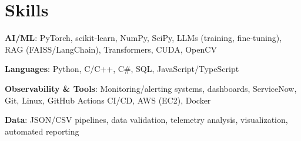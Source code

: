 \documentclass[letterpaper,10pt]{article}
\begin{document}
\section{Skills}
 \resumeSubHeadingListStart
   \item{
     \textbf{AI/ML}{: PyTorch, scikit-learn, NumPy, SciPy, LLMs (training, fine-tuning), RAG (FAISS/LangChain), Transformers, CUDA, OpenCV}
   }
   \item{
     \textbf{Languages}{: Python, C/C++, C\#, SQL, JavaScript/TypeScript}
   }
   \item{
     \textbf{Observability \& Tools}{: Monitoring/alerting systems, dashboards, ServiceNow, Git, Linux, GitHub Actions CI/CD, AWS (EC2), Docker}
   }
   \item{
     \textbf{Data}{: JSON/CSV pipelines, data validation, telemetry analysis, visualization, automated reporting}
   }
 \resumeSubHeadingListEnd

\end{document}
